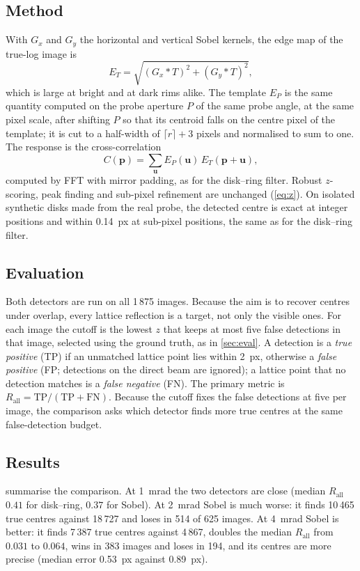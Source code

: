 \documentclass[11pt,a4paper]{article}
\newcommand{\vect}[1]{\bm{#1}}
\newcommand{\Rall}{R_{\mathrm{all}}}
\begin{document}
\subsection{Method}
With $G_x$ and $G_y$ the horizontal and vertical Sobel kernels, the edge map of the true-log image is
\begin{equation}
  E_T = \sqrt{(G_x * T)^2 + (G_y * T)^2} ,
  \label{eq:sobel}
\end{equation}
which is large at bright and at dark rims alike. The template $E_P$ is the same quantity computed on the probe aperture
$P$ of the same probe angle, at the same pixel scale, after shifting $P$ so that its centroid falls on the centre pixel of
the template; it is cut to a half-width of $\lceil r\rceil + 3$ pixels and normalised to sum to one. The response is
the cross-correlation
\begin{equation}
  C(\vect p) = \sum_{\vect u} E_P(\vect u)\, E_T(\vect p + \vect u),
  \label{eq:sobelcorr}
\end{equation}
computed by FFT with mirror padding, as for the disk--ring filter. Robust $z$-scoring, peak finding and sub-pixel refinement
are unchanged (\cref{eq:z}). On isolated synthetic disks made from the real probe, the detected centre is exact at integer
positions and within \SI{0.14}{px} at sub-pixel positions, the same as for the disk--ring filter.

\subsection{Evaluation}
Both detectors are run on all 1\,875 images. Because the aim is to recover centres under overlap, every lattice reflection
is a target, not only the visible ones. For each image the cutoff is the lowest $z$ that keeps at most five false
detections in that image, selected using the ground truth, as in \cref{sec:eval}. A detection is a \emph{true positive}
(TP) if an unmatched lattice point lies within \SI{2}{px}, otherwise a \emph{false positive} (FP; detections on the direct
beam are ignored); a lattice point that no detection matches is a \emph{false negative} (FN). The primary metric is
$\Rall = \mathrm{TP}/(\mathrm{TP} + \mathrm{FN})$. Because the cutoff fixes the false detections at five per image, the
comparison asks which detector finds more true centres at the same false-detection budget.

\subsection{Results}
 summarise the comparison. At \SI{1}{\milli\radian} the two detectors are close
(median $\Rall$ $0.41$ for disk--ring, $0.37$ for Sobel). At \SI{2}{\milli\radian} Sobel is much worse: it finds 10\,465 true
centres against 18\,727 and loses in 514 of 625 images. At \SI{4}{\milli\radian} Sobel is better: it finds 7\,387 true
centres against 4\,867, doubles the median $\Rall$ from $0.031$ to $0.064$, wins in 383 images and loses in 194, and its
centres are more precise (median error \SI{0.53}{px} against \SI{0.89}{px}).
\end{document}
